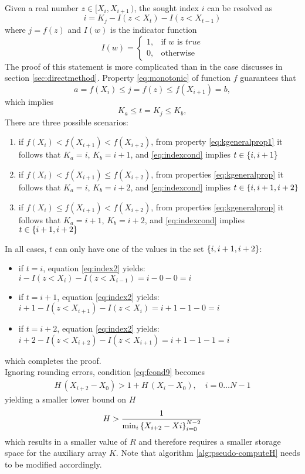 \documentclass[preprint,1p,times]{elsarticle}
\begin{document}
Given a real number $z\in[X_{i},X_{i+1}\,)$, the sought index $i$ can be resolved as
\begin{equation}
\label{eq:index2}
	i=K_j-I(z<X_t)-I(z<X_{t-1})
\end{equation}
where $j=f(z)$ and $I(w)$ is the indicator function
$$
	I(w)=\left\{\begin{array}{ll}
		1, &\text{if $w$ is $true$} \\
		0, &\text{otherwise}
	\end{array}\right.
$$
The proof of this statement is more complicated than in the case discusses in section \ref{sec:directmethod}.
Property \eqref{eq:monotonic} of function $f$ guarantees that
$$
 	a=f(X_{i}) \leq j=f(z) \leq f(X_{i+1})=b,
$$
which implies
\begin{equation}
\label{eq:indexcond}
K_a \leq t=K_j \leq K_b,
\end{equation}
There are three possible scenarios:
\begin{enumerate}
	\item if $f(X_{i})<f(X_{i+1})<f(X_{i+2})$, from property \eqref{eq:kgeneralprop1} it follows that $K_a=i$, $K_b=i+1$, and \eqref{eq:indexcond} implies $t \in \left \{ i,i+1 \right \}$
	\item if $f(X_{i})<f(X_{i+1}) \leq f(X_{i+2})$, from properties \eqref{eq:kgeneralprop} it follows that $K_a=i$, $K_b=i+2$, and \eqref{eq:indexcond} implies $t \in \left \{ i,i+1,i+2 \right \}$
	\item if $f(X_{i})\leq f(X_{i+1}) < f(X_{i+2})$, from properties \eqref{eq:kgeneralprop} it follows that $K_a=i+1$, $K_b=i+2$, and \eqref{eq:indexcond} implies $t \in \left \{ i+1,i+2 \right \}$
\end{enumerate}
In all cases, $t$ can only have one of the values in the set $\left \{ i,i+1,i+2 \right \}$:
\begin{itemize}
	\item if $t=i$, equation \eqref{eq:index2} yields: $i-I(z<X_i)-I(z<X_{i-1})=i-0-0=i$
	\item if $t=i+1$, equation \eqref{eq:index2} yields: $i+1-I(z<X_{i+1})-I(z<X_{i})=i+1-1-0=i$
	\item if $t=i+2$, equation \eqref{eq:index2} yields: $i+2-I(z<X_{i+2})-I(z<X_{i+1})=i+1-1-1=i$
\end{itemize}
which completes the proof. \\

Ignoring rounding errors, condition \eqref{eq:fcond9} becomes
\begin{align}
\label{eq:fcond10}
	H\,(X_{i+2}-X_0) > 1+ H\,(X_i-X_0), \quad  i=0 \dots N-1
\end{align}
yielding a smaller lower bound on $H$
\begin{align}
\label{eq:fcond10}
	H > \frac{1}{\min_i\left \{ X_{i+2}-Xi \right \}_{i=0}^{N-2}}
\end{align}
which results in a smaller value of $R$ and therefore requires a smaller storage space for the auxiliary array $K$. Note that algorithm \ref{alg:pseudo-computeH} needs to be modified accordingly. \\
\end{document}

